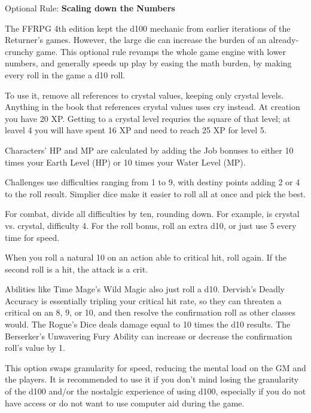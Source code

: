 \begin{multiboco}
    Optional Rule: \textbf{Scaling down the Numbers}\label{optrule:scaling}\pc%

    The FFRPG 4th edition kept the d100 mechanic from earlier iterations of the Returner’s games. However, the large die can increase the burden of an already-crunchy game. This optional rule revamps the whole game engine with lower numbers, and generally speeds up play by easing the math burden, by making every roll in the game a d10 roll.

    To use it, remove all references to crystal values, keeping only crystal levels. Anything in the book that references crystal values uses cry instead. At creation you have 20 XP\@. Getting to a crystal level requries the square of that level; at leavel 4 you will have spent 16 XP and need to reach 25 XP for level 5.

    Characters' HP and MP are calculated by adding the Job bonuses to either 10 times your Earth Level (HP) or 10 times your Water Level (MP).

    Challenges use difficulties ranging from 1 to 9, with destiny points adding 2 or 4 to the roll result. Simplier dice make it easier to roll all at once and pick the best.

    For combat, divide all difficulties by ten, rounding down. For example,  is crystal vs. crystal, difficulty 4. For the roll bonus, roll an extra d10, or just use 5 every time for speed.

    When you roll a natural 10 on an action able to critical hit, roll again. If the second roll is a hit, the attack is a crit.

    Abilities like Time Mage’s Wild Magic also just roll a d10. Dervish's Deadly Accuracy is essentially tripling your critical hit rate, so they can threaten a critical on an 8, 9, or 10, and then resolve the confirmation roll as other classes would. The Rogue’s Dice deals damage equal to 10 times the d10 results. The Berserker’s Unwavering Fury Ability can increase or decrease the confirmation roll’s value by 1.

    This option swaps granularity for speed, reducing the mental load on the GM and the players. It is recommended to use it if you don’t mind losing the granularity of the d100 and/or the nostalgic experience of using d100, especially if you do not have access or do not want to use computer aid during the game.
\end{multiboco}

